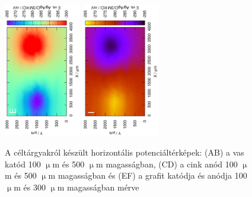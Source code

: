 \begin{figure}
\includegraphics[width=0.3\textwidth, angle=-90]{img/mérések/grafit_h1_100.eps}
\includegraphics[width=0.3\textwidth, angle=-90]{img/mérések/grafit_h_300.eps}
\caption{A céltárgyakról készült horizontális potenciáltérképek:
(AB) a vas katód 100 $\upmu$m és 500 $\upmu$m magasságban, (CD) a cink anód 100 $\upmu$m és 500 $\upmu$m magasságban és (EF) a grafit katódja és anódja 100 $\upmu$m és 300 $\upmu$m magasságban mérve}
\label{fig:horizontális}
\end{figure}

